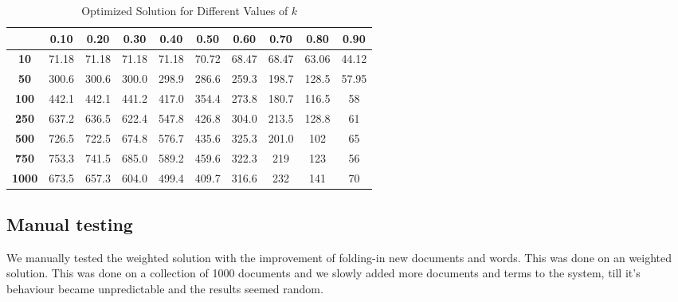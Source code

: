 \documentclass[12pt,a4paper]{article}
\begin{document}
\begin{table}[h!]
    \centering
    \setlength{\arrayrulewidth}{0.5mm} %
    \renewcommand{\arraystretch}{1.5} %
    \begin{tabular}{|c|c|c|c|c|c|c|c|c|c|}
    \hline
    \rowcolor{black!75} %
    & \color{white}\textbf{0.10} & \color{white}\textbf{0.20} & \color{white}\textbf{0.30} & \color{white}\textbf{0.40} & \color{white}\textbf{0.50} & \color{white}\textbf{0.60} & \color{white}\textbf{0.70} & \color{white}\textbf{0.80} & \color{white}\textbf{0.90} \\ \hline
    \cellcolor{black!75}\color{white}\textbf{10}   & 71.18 & 71.18 & 71.18 & 71.18 & 70.72 & 68.47 & 68.47 & 63.06 & 44.12 \\ \hline
    \cellcolor{black!75}\color{white}\textbf{50}    & 300.6 & 300.6 & 300.0 & 298.9 & 286.6 & 259.3 & 198.7 & 128.5 & 57.95 \\ \hline
    \cellcolor{black!75}\color{white}\textbf{100}   & 442.1 & 442.1 & 441.2 & 417.0 & 354.4 & 273.8 & 180.7 & 116.5 & 58 \\ \hline
    \cellcolor{black!75}\color{white}\textbf{250}   & 637.2 & 636.5 & 622.4 & 547.8 & 426.8 & 304.0 & 213.5 & 128.8 & 61 \\ \hline
    \cellcolor{black!75}\color{white}\textbf{500}   & 726.5 & 722.5 & 674.8 & 576.7 & 435.6 & 325.3 & 201.0 & 102 & 65 \\ \hline
    \cellcolor{black!75}\color{white}\textbf{750}   & 753.3 & 741.5 & 685.0 & 589.2 & 459.6 & 322.3 & 219 & 123 & 56 \\ \hline
    \cellcolor{black!75}\color{white}\textbf{1000}  & 673.5 & 657.3 & 604.0 & 499.4 & 409.7 & 316.6 & 232 & 141 & 70 \\ \hline
    \end{tabular}
    \caption{Optimized Solution for Different Values of $k$}
\end{table}

\subsection{Manual testing}
We manually tested the weighted solution with the improvement of folding-in new documents and words. This was done on an weighted solution. This was done on a collection of 1000 documents and we slowly added more documents and terms to the system, till it's behaviour became unpredictable and the results seemed random.
\end{document}
